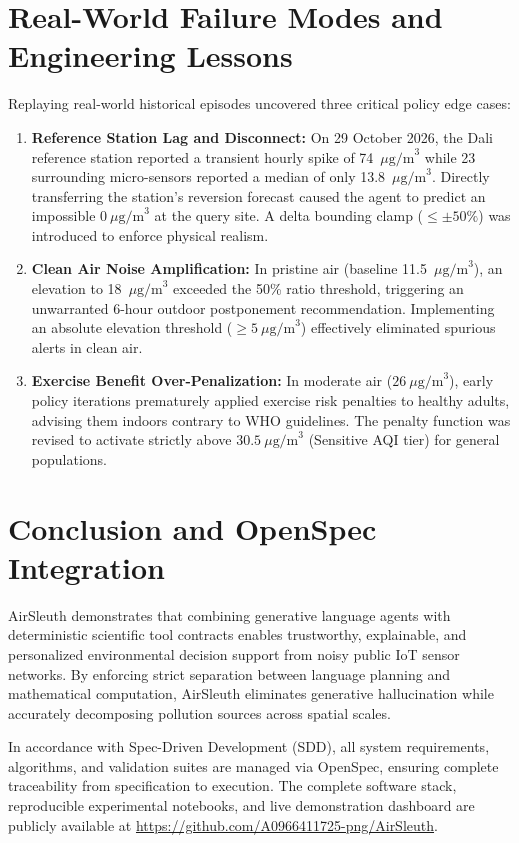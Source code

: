 \documentclass[conference]{IEEEtran}
\begin{document}
\section{Real-World Failure Modes and Engineering Lessons}
Replaying real-world historical episodes uncovered three critical policy edge cases:
\begin{enumerate}
    \item \textbf{Reference Station Lag and Disconnect:} On 29 October 2026, the Dali reference station reported a transient hourly spike of 74~$\mu\text{g/m}^3$ while 23 surrounding micro-sensors reported a median of only 13.8~$\mu\text{g/m}^3$. Directly transferring the station's reversion forecast caused the agent to predict an impossible $0~\mu\text{g/m}^3$ at the query site. A delta bounding clamp ($\le \pm 50\%$) was introduced to enforce physical realism.
    \item \textbf{Clean Air Noise Amplification:} In pristine air (baseline 11.5~$\mu\text{g/m}^3$), an elevation to 18~$\mu\text{g/m}^3$ exceeded the 50\% ratio threshold, triggering an unwarranted 6-hour outdoor postponement recommendation. Implementing an absolute elevation threshold ($\ge 5~\mu\text{g/m}^3$) effectively eliminated spurious alerts in clean air.
    \item \textbf{Exercise Benefit Over-Penalization:} In moderate air ($26~\mu\text{g/m}^3$), early policy iterations prematurely applied exercise risk penalties to healthy adults, advising them indoors contrary to WHO guidelines. The penalty function was revised to activate strictly above $30.5~\mu\text{g/m}^3$ (Sensitive AQI tier) for general populations.
\end{enumerate}

\section{Conclusion and OpenSpec Integration}
AirSleuth demonstrates that combining generative language agents with deterministic scientific tool contracts enables trustworthy, explainable, and personalized environmental decision support from noisy public IoT sensor networks. By enforcing strict separation between language planning and mathematical computation, AirSleuth eliminates generative hallucination while accurately decomposing pollution sources across spatial scales. 

In accordance with Spec-Driven Development (SDD), all system requirements, algorithms, and validation suites are managed via OpenSpec, ensuring complete traceability from specification to execution. The complete software stack, reproducible experimental notebooks, and live demonstration dashboard are publicly available at \url{https://github.com/A0966411725-png/AirSleuth}.
\end{document}
